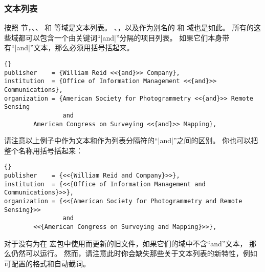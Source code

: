 \subsubsection{文本列表}%
\label{bib:use:and}


按照  节，、、 和  等域是文本列表。
、，以及作为别名的  和  域也是如此。
所有的这些域都可以包含一个由关键词“|and|”分隔的项目列表。
如果它们本身带有“|and|”文本，那么必须用括号括起来。

\begin{lstlisting}[style=bibtex]{}
publisher    = {William Reid <<{and}>> Company},
institution  = {Office of Information Management <<{and}>> Communications},
organization = {American Society for Photogrammetry <<{and}>> Remote Sensing
                and
		American Congress on Surveying <<{and}>> Mapping},
\end{lstlisting}
%
请注意以上例子中作为文本和作为列表分隔符的“|and|”之间的区别。
你也可以把整个名称用括号括起来：

\begin{lstlisting}[style=bibtex]{}
publisher    = {<<{William Reid and Company}>>},
institution  = {<<{Office of Information Management and Communications}>>},
organization = {<<{American Society for Photogrammetry and Remote Sensing}>>
                and
		<<{American Congress on Surveying and Mapping}>>},
\end{lstlisting}
%
对于没有为在 \biblatex 宏包中使用而更新的旧文件，如果它们的域中不含“and”文本，
那么仍然可以运行。
然而，请注意此时你会缺失那些关于文本列表的新特性，例如可配置的格式和自动截词。

